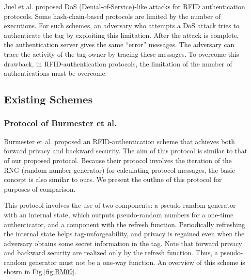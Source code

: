 \documentclass[english]{llncs}
\begin{document}
Juel et al. proposed DoS (Denial-of-Service)-like attacks for RFID
authentication protocols\cite{JW06}. Some hash-chain-based protocols
are limited by the number of executions. For such schemes, an adversary
who attempts a DoS attack tries to authenticate the tag by exploiting
this limitation. After the attack is complete, the authentication
server gives the same {}``error'' messages. The adversary can trace
the activity of the tag owner by tracing these messages. To overcome
this drawback, in RFID-authentication protocols, the limitation of
the number of authentications must be overcome.




\subsection{Existing Schemes}


\subsubsection{Protocol of Burmester et al.}

Burmester et al. proposed an RFID-authentication scheme that achieves
both forward privacy and backward security\cite{BM09}.
The aim of this protocol is similar to that of our proposed protocol.
Because their protocol involves the iteration of the RNG (random number
generator) for calculating protocol messages, the basic concept is
also similar to ours. We present the outline of this protocol for
purposes of comparison.

This protocol involves the use of two components: a pseudo-random
generator with an internal state, which outputs pseudo-random numbers
for a one-time authenticator, and a component with the refresh function.
Periodically refreshing the internal state helps tag-unforgeability,
and privacy is regained even when the adversary obtains some secret
information in the tag. Note that forward privacy and backward security
are realized only by the refresh function. Thus, a pseudo-random generator
must not be a one-way function. An overview
of this scheme is shown in Fig.\ref{fig:BM09}.

%
\end{document}

